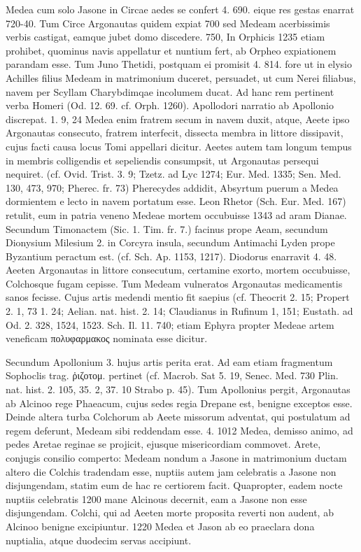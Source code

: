 \documentclass[landscape, a4paper, 11pt, oneside, polutonikogreek, german]{article}
\begin{document}
Medea cum solo Jasone in Circae aedes se confert 4. 690. eique res gestas enarrat 720-40. Tum Circe Argonautas quidem expiat 700 sed Medeam acerbissimis verbis castigat, eamque jubet domo discedere. 750, In Orphicis 1235 etiam prohibet, quominus navis appellatur et nuntium fert, ab Orpheo expiationem parandam esse. Tum Juno Thetidi, postquam ei promisit 4. 814. fore ut in elysio Achilles filius Medeam in matrimonium duceret, persuadet, ut cum Nerei filiabus, navem per Scyllam Charybdimqae incolumem ducat. Ad hanc rem pertinent verba Homeri (Od. 12. 69. cf. Orph. 1260). Apollodori narratio ab Apollonio discrepat. 1. 9, 24 Medea enim fratrem secum in navem duxit, atque, Aeete ipso Argonautas consecuto, fratrem interfecit, dissecta membra in littore dissipavit, cujus facti causa locus Tomi appellari dicitur. Aeetes autem tam longum tempus in membris colligendis et sepeliendis consumpsit, ut Argonautas persequi nequiret. (cf. Ovid. Trist. 3. 9; Tzetz. ad Lyc 1274; Eur. Med. 1335; Sen. Med. 130, 473, 970; Pherec. fr. 73) Pherecydes addidit, Absyrtum puerum a Medea dormientem e lecto in navem portatum esse. Leon Rhetor (Sch. Eur. Med. 167) retulit, eum in patria veneno Medeae mortem occubuisse 1343 ad aram Dianae. Secundum Timonactem (Sic. 1. Tim. fr. 7.) facinus prope Aeam, secundum Dionysium Milesium 2. in Corcyra insula, secundum Antimachi Lyden prope Byzantium peractum est. (cf. Sch. Ap. 1153, 1217). Diodorus enarravit 4. 48. Aeeten Argonautas in littore consecutum, certamine exorto, mortem occubuisse, Colchosque fugam cepisse. Tum Medeam vulneratos Argonautas medicamentis sanos fecisse. Cujus artis medendi mentio fit saepius (cf. Theocrit 2. 15; Propert 2. 1, 73 1. 24; Aelian. nat. hist. 2. 14; Claudianus in Rufinum 1, 151; Eustath. ad Od. 2. 328, 1524, 1523. Sch. Il. 11. 740; etiam Ephyra propter Medeae artem veneficam πολυφαρμακος nominata esse dicitur.

Secundum Apollonium 3. hujus artis perita erat. Ad eam etiam fragmentum Sophoclis trag. ῥιζοτομ. pertinet (cf. Macrob. Sat 5. 19, Senec. Med. 730 Plin. nat. hist. 2. 105, 35. 2, 37. 10 Strabo p. 45). Tum Apollonius pergit, Argonautas ab Alcinoo rege Phaeacum, cujus sedes regia Drepane est, benigne exceptos esse. Deinde altera turba Colchorum ab Aeete missorum adventat, qui postulatum ad regem deferunt, Medeam sibi reddendam esse. 4. 1012 Medea, demisso animo, ad pedes Aretae reginae se projicit, ejusque misericordiam commovet. Arete, conjugis consilio comperto: Medeam nondum a Jasone in matrimonium ductam altero die Colchis tradendam esse, nuptiis autem jam celebratis a Jasone non disjungendam, statim eum de hac re certiorem facit. Quapropter, eadem nocte nuptiis celebratis 1200 mane Alcinous decernit, eam a Jasone non esse disjungendam. Colchi, qui ad Aeeten morte proposita reverti non audent, ab Alcinoo benigne excipiuntur. 1220 Medea et Jason ab eo praeclara dona nuptialia, atque duodecim servas accipiunt.
\end{document}

